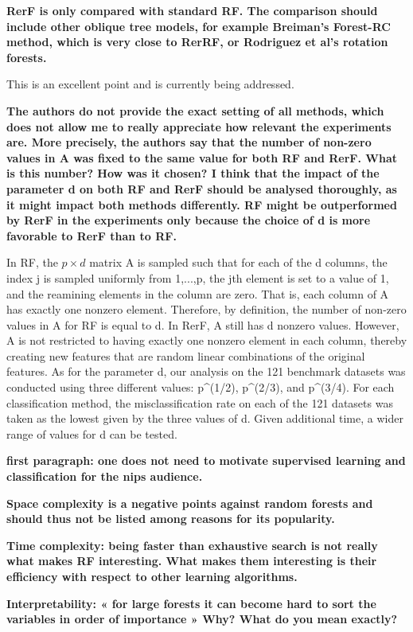 \textbf{RerF is only compared with standard RF. The comparison should include other oblique tree models, for example Breiman’s Forest-RC method, which is very close to RerRF, or Rodriguez et al’s rotation forests.}

This is an excellent point and is currently being addressed. 

\textbf{The authors do not provide the exact setting of all methods, which does not allow me to really appreciate how relevant the experiments are. More precisely, the authors say that the number of non-zero values in A was fixed to the same value for both RF and RerF. What is this number? How was it chosen? I think that the impact of the parameter d on both RF and RerF should be analysed thoroughly, as it might impact both methods differently. RF might be outperformed by RerF in the experiments only because the choice of d is more favorable to RerF than to RF.}

In RF, the $p \times d$ matrix A is sampled such that for each of the d columns, the index j is sampled uniformly from {1,...,p}, the jth element is set to a value of 1, and the reamining elements in the column are zero. That is, each column of A has exactly one nonzero element. Therefore, by definition, the number of non-zero values in A for RF is equal to d. In RerF, A still has d nonzero values. However, A is not restricted to having exactly one nonzero element in each column, thereby creating new features that are random linear combinations of the original features. As for the parameter d, our analysis on the 121 benchmark datasets was conducted using three different values: p^(1/2), p^(2/3), and p^(3/4). For each classification method, the misclassification rate on each of the 121 datasets was taken as the lowest given by the three values of d. Given additional time, a wider range of values for d can be tested. 

\textbf{first paragraph: one does not need to motivate supervised learning and classification for the nips audience.}

\textbf{Space complexity is a negative points against random forests and should thus not be listed among reasons for its popularity.}

\textbf{Time complexity: being faster than exhaustive search is not really what makes RF interesting. What makes them interesting is their efficiency with respect to other learning algorithms.}

\textbf{Interpretability: « for large forests it can become hard to sort the variables in order of importance » Why? What do you mean exactly?}

